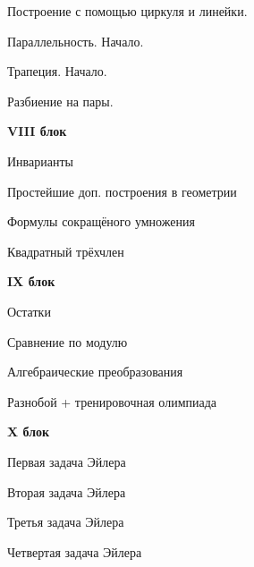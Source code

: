 Построение с помощью циркуля и линейки.

Параллельность. Начало.

Трапеция. Начало.

Разбиение на пары.


\textbf{\Large VIII блок}

Инварианты

Простейшие доп. построения в геометрии

Формулы сокращёного умножения

Квадратный трёхчлен

\textbf{\Large IX блок}

Остатки

Сравнение по модулю

Алгебраические преобразования

Разнобой + тренировочная олимпиада

\textbf{\Large X блок}

Первая задача Эйлера

Вторая задача Эйлера

Третья задача Эйлера

Четвертая задача Эйлера